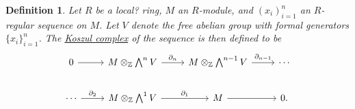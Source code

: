 \documentclass[11pt, a4paper, english]{article}
\numberwithin{prop}{section}
\numberwithin{lemma}{section}
\numberwithin{theorem}{section}
\newtheorem{defin}{Definition}
\numberwithin{defin}{section}
\numberwithin{example}{section}
\newcommand{\Z}{\mathbb{Z}}
\begin{document}
\begin{defin}
Let $R$ be a {\color{red}local?} ring, $M$ an $R$-module, and $(x_i)_{i=1}^n$ an $R$-regular sequence on $M$. Let $V$ denote the free abelian group with formal generators $\{ x_i \}_{i=1}^n$. The \underline{Koszul complex} of the sequence is then defined to be
\begin{equation*}
\begin{tikzcd}
0 \arrow[r] & M \otimes_\Z \bigwedge^n V \arrow[r]{}{\partial_n} & M \otimes_\Z \bigwedge^{n-1} V \arrow[r]{}{\partial_{n-1}} & \cdots \\ 
\cdots \arrow[r]{}{\partial_2} & M \otimes_\Z \bigwedge^1 V \arrow[r]{}{\partial_1} & M \arrow[r] & 0.
\end{tikzcd}
\end{equation*}
\end{defin}
\end{document}
